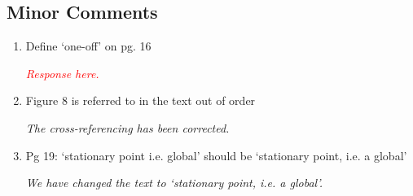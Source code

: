 \documentclass{article}
\newcommand{\dean}[1]{\textcolor{red}{#1}}
\begin{document}
			\subsection{Minor Comments}
			\begin{enumerate}
			 \item 	Define `one-off' on pg. 16 

 			\emph{\dean{Response here.}}

  		\item Figure 8 is referred to in the text out of order

  			\emph{The cross-referencing has been corrected.}
			 
			\item Pg 19: `stationary point i.e. global' should be `stationary point, i.e. a global'

			\emph{We have changed the text to `stationary point, i.e. a global'.}		
			                   
			
			 
				\end{enumerate} 
				
			
\end{document}
